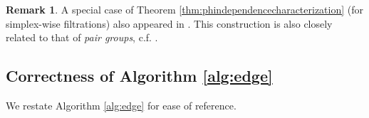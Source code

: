 \documentclass[11pt,onecolumn]{article}
\newtheorem{theorem}{Theorem}[section] %
\newtheorem{lemma}[theorem]{Lemma}
\newenvironment{proof}{{\em Proof:}}{\hfill{\hfill\rule{2mm}{2mm}}}
\newcommand{\cyclea}{\mathbf{a}}
\newcommand{\cycleb}{\mathbf{b}}
\theoremstyle{plain}
\theoremstyle{definition}
\newtheorem{remark}[theorem]{Remark}
\begin{document}





\begin{remark}
A special case of Theorem \ref{thm:phindependencecharacterization} (for simplex-wise filtrations) also appeared in \cite[Theorem 1]{wu}.  This construction is also closely related to that of \emph{pair groups}, c.f.  \cite{persistenthomologyasurvey}.
\end{remark}    

\subsection{Correctness of Algorithm \ref{alg:edge}}


We restate Algorithm \ref{alg:edge} for ease of reference.
\end{document}

